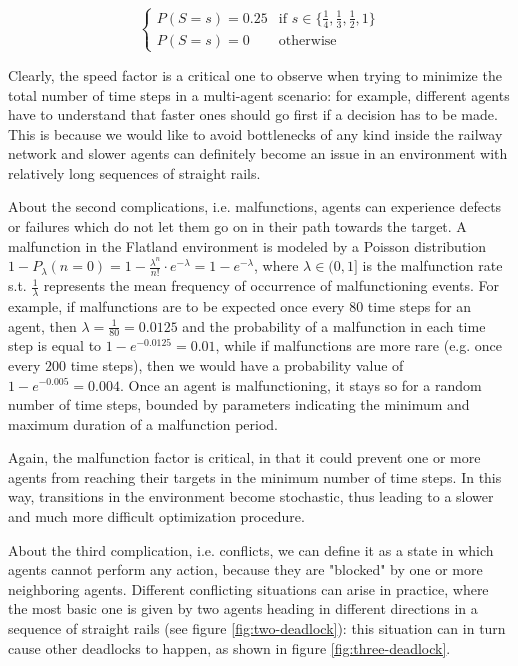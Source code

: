 \documentclass[a4paper,10pt]{report}
\begin{document}
\begin{equation}
	\begin{cases}
		P(S=s) = 0.25 & \text{if } s \in \{\frac{1}{4}, \frac{1}{3}, \frac{1}{2}, 1\} \\
		P(S=s) = 0    & \text{otherwise}
	\end{cases}
\end{equation}

Clearly, the speed factor is a critical one to observe when trying to minimize the total number of time steps in a multi-agent scenario: for example, different agents have to understand that faster ones should go first if a decision has to be made. This is because we would like to avoid bottlenecks of any kind inside the railway network and slower agents can definitely become an issue in an environment with relatively long sequences of straight rails.

About the second complications, i.e. malfunctions, agents can experience defects or failures which do not let them go on in their path towards the target. A malfunction in the Flatland environment is modeled by a Poisson distribution $1 - P_{\lambda}(n=0)=1 - \frac{\lambda^{n}}{n!}\cdot e^{-\lambda}=1 - e^{-\lambda}$, where $\lambda \in (0, 1]$ is the malfunction rate s.t. $\frac{1}{\lambda}$ represents the mean frequency of occurrence of malfunctioning events. For example, if malfunctions are to be expected once every $80$ time steps for an agent, then $\lambda=\frac{1}{80}=0.0125$ and the probability of a malfunction in each time step is equal to $1-e^{-0.0125}=0.01$, while if malfunctions are more rare (e.g. once every $200$ time steps), then we would have a probability value of $1-e^{-0.005}=0.004$. Once an agent is malfunctioning, it stays so for a random number of time steps, bounded by parameters indicating the minimum and maximum duration of a malfunction period.

Again, the malfunction factor is critical, in that it could prevent one or more agents from reaching their targets in the minimum number of time steps. In this way, transitions in the environment become stochastic, thus leading to a slower and much more difficult optimization procedure.

About the third complication, i.e. conflicts, we can define it as a state in which agents cannot perform any action, because they are "blocked" by one or more neighboring agents. Different conflicting situations can arise in practice, where the most basic one is given by two agents heading in different directions in a sequence of straight rails (see figure \ref{fig:two-deadlock}): this situation can in turn cause other deadlocks to happen, as shown in figure \ref{fig:three-deadlock}.
\end{document}
